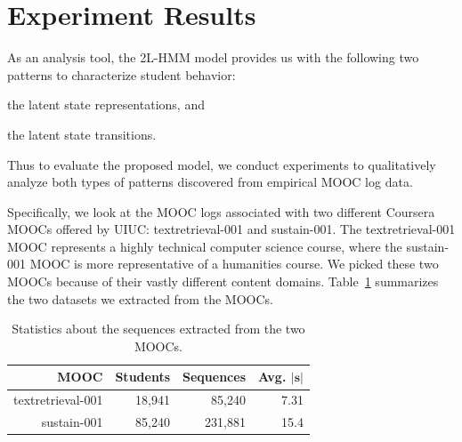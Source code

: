 \newcommand{\textretrieval}{textretrieval-001}

\newcommand{\sustain}{sustain-001}

\newcommand{\UIUC}{UIUC}

\section{Experiment Results}
As an analysis tool, the 2L-HMM model provides us with the following two
patterns to characterize student behavior:
\begin{enumerate*}[label=(\arabic*)]
  \item the latent state representations, and
  \item the latent state transitions.
\end{enumerate*}
Thus to evaluate the proposed model, we conduct experiments to
qualitatively analyze both types of patterns discovered from empirical MOOC
log data.

Specifically, we look at the MOOC logs associated with two different
Coursera MOOCs offered by \UIUC{}: \textretrieval{} and \sustain{}.  The
\textretrieval{} MOOC represents a highly technical computer science course,
where the \sustain{} MOOC is more representative of a humanities course. We
picked these two MOOCs because of their vastly different content domains.
Table~\ref{table:datasets} summarizes the two datasets we extracted from
the MOOCs.

\begin{table}
  \begin{center}
    \caption{Statistics about the sequences extracted from the two MOOCs.}
    \label{table:datasets}
    \begin{tabular}{rrrr}
      \textbf{MOOC} & \textbf{Students} & \textbf{Sequences} & \textbf{Avg.
      $|\mathbf{s}|$}\\\hline
      \textretrieval{} & 18,941 & 85,240 & 7.31\\
      \sustain{} & 85,240 & 231,881 & 15.4
    \end{tabular}
  \end{center}
\end{table}


